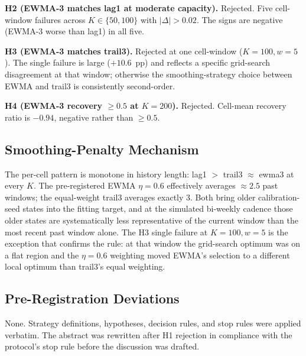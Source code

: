 \textbf{H2 (EWMA-3 matches \textsf{lag1} at moderate capacity).}
Rejected. Five cell-window failures across $K \in \{50, 100\}$ with
$|\Delta| > 0.02$. The signs are negative (EWMA-3 worse than
\textsf{lag1}) in all five.

\textbf{H3 (EWMA-3 matches \textsf{trail3}).} Rejected at one
cell-window ($K = 100, w = 5$). The single failure is large
($+10.6$~pp) and reflects a specific grid-search disagreement at
that window; otherwise the smoothing-strategy choice between EWMA
and trail3 is consistently second-order.

\textbf{H4 (EWMA-3 recovery $\geq 0.5$ at $K = 200$).} Rejected.
Cell-mean recovery ratio is $-0.94$, negative rather than $\geq 0.5$.

\subsection{Smoothing-Penalty Mechanism}

The per-cell pattern is monotone in history length:
\textsf{lag1} $>$ \textsf{trail3} $\approx$ \textsf{ewma3} at every
$K$. The pre-registered EWMA $\eta = 0.6$ effectively averages
$\approx 2.5$ past windows; the equal-weight \textsf{trail3} averages
exactly 3. Both bring older calibration-seed states into the
fitting target, and at the simulated bi-weekly cadence those older
states are systematically less representative of the current window
than the most recent past window alone. The H3 single failure at
$K = 100, w = 5$ is the exception that confirms the rule: at that
window the grid-search optimum was on a flat region and the
$\eta = 0.6$ weighting moved EWMA's selection to a different local
optimum than trail3's equal weighting.

\subsection{Pre-Registration Deviations}

None. Strategy definitions, hypotheses, decision rules, and stop
rules were applied verbatim. The abstract was rewritten after H1
rejection in compliance with the protocol's stop rule before the
discussion was drafted.
